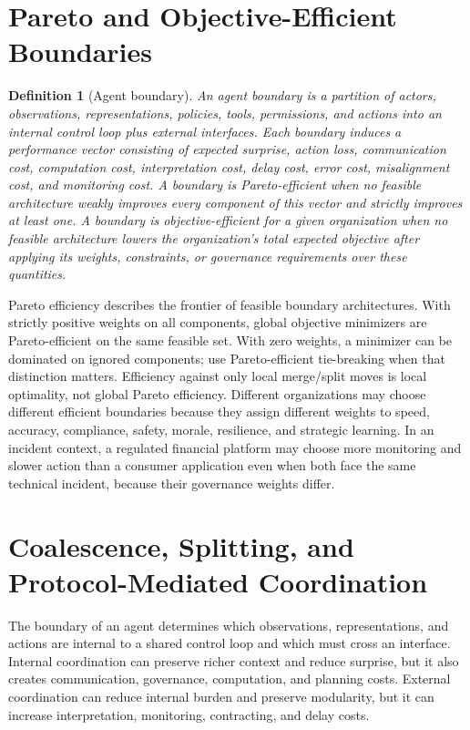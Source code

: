 \documentclass[11pt]{article}
\newtheorem{definition}{Definition}
\begin{document}
\section{Pareto and Objective-Efficient Boundaries}

\begin{definition}[Agent boundary]
An agent boundary is a partition of actors, observations, representations,
policies, tools, permissions, and actions into an internal control loop plus
external interfaces. Each boundary induces a performance vector consisting of
expected surprise, action loss, communication cost, computation cost,
interpretation cost, delay cost, error cost, misalignment cost, and monitoring
cost. A
boundary is \emph{Pareto-efficient} when no feasible architecture weakly
improves every component of this vector and strictly improves at least one. A
boundary is \emph{objective-efficient} for a given organization when no
feasible architecture lowers the organization's total expected objective
after applying its weights, constraints, or governance requirements over these
quantities.
\end{definition}

Pareto efficiency describes the frontier of feasible boundary architectures.
With strictly positive weights on all components, global objective
minimizers are Pareto-efficient on the same feasible set. With zero weights,
a minimizer can be dominated on ignored components; use Pareto-efficient
tie-breaking when that distinction matters. Efficiency against only local
merge/split moves is local optimality, not global Pareto efficiency. Different organizations
may choose different efficient boundaries because they assign different
weights to speed, accuracy, compliance, safety, morale, resilience, and
strategic learning. In an incident context, a regulated financial platform may
choose more monitoring and slower action than a consumer application even when
both face the same technical incident, because their governance weights differ.

\section{Coalescence, Splitting, and Protocol-Mediated Coordination}
\label{sec:coalescence}

The boundary of an agent determines which observations, representations, and
actions are internal to a shared control loop and which must cross an
interface. Internal coordination can preserve richer context and reduce
surprise, but it also creates communication, governance, computation, and
planning costs. External coordination can reduce internal burden and preserve
modularity, but it can increase interpretation, monitoring, contracting, and
delay costs.
\end{document}
